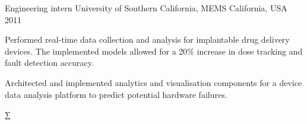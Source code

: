 \begin{cventries}





\cventry
{Engineering intern}
{University of Southern California, MEMS}
{California, USA}
{2011}
{
\begin{cvitems}
\item {Performed real-time data collection and analysis for implantable drug delivery devices. The implemented models allowed for a 20\% increase in dose tracking and fault detection accuracy.}
\item {Architected and implemented analytics and visualisation components for a device data analysis platform to predict potential hardware failures.}
\end{cvitems}
}


\end{cventries}∑
